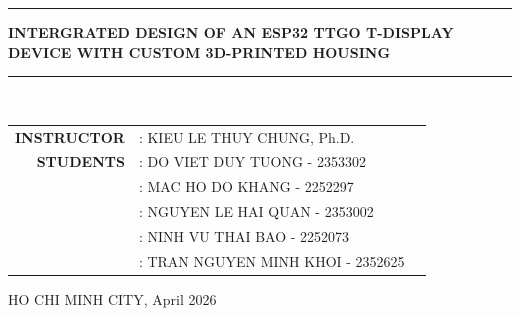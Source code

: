 \documentclass[a4paper]{report}
\begin{document}
\begin{titlepage}
  \rule[0.4cm]{\linewidth}{0.3mm}
  \centering
  {\Large \bfseries \MakeUppercase{INTERGRATED DESIGN OF AN ESP32 TTGO T-DISPLAY DEVICE WITH CUSTOM 3D-PRINTED HOUSING}}
  
  \rule{\linewidth}{0.2mm} \\[0.1cm]
  
  \begin{center}
    \begin{tabular}[H]{r l l}
      \textbf{INSTRUCTOR} & : KIEU LE THUY CHUNG, Ph.D.\\
      \textbf{STUDENTS}   & : DO VIET DUY TUONG - 2353302\\
      & : MAC HO DO KHANG - 2252297\\
      & : NGUYEN LE HAI QUAN - 2353002\\
      & : NINH VU THAI BAO - 2252073\\
      & : TRAN NGUYEN MINH KHOI - 2352625\\
    \end{tabular}
  \end{center}
  
  \vspace{2cm}
  
  \begin{center}
    {\fontsize{12pt}{0pt} HO CHI MINH CITY, April 2026}
  \end{center}
  
\end{titlepage}

\restoregeometry


\renewcommand{\figurename}{\textbf{Figure}}  %
\renewcommand{\tablename}{\textbf{Table}}    %
\newpage


\end{document}
